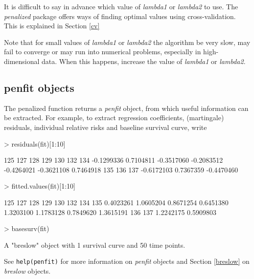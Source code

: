 \documentclass[a4paper]{article}
\newcommand{\Robject}[1]{{\texttt{#1}}}
\newcommand{\Rpackage}[1]{{\textit{#1}}}
\newcommand{\Rclass}[1]{{\textit{#1}}}
\newcommand{\Rfunarg}[1]{{\textit{#1}}}
\begin{document}
It is difficult to say in advance which value of \Rfunarg{lambda1} or \Rfunarg{lambda2} to use. The \Rpackage{penalized} package offers ways of finding optimal values using cross-validation. This is explained in Section \ref{cv}

Note that for small values of \Rfunarg{lambda1} or \Rfunarg{lambda2} the algorithm be very slow, may fail to converge or may run into numerical problems, especially in high-dimensional data. When this happens, increase the value of \Rfunarg{lambda1} or \Rfunarg{lambda2}.


\subsection{penfit objects}

The penalized function returns a \Rclass{penfit} object, from which useful information can be extracted. For example, to extract regression coefficients, (martingale) residuals, individual relative risks and baseline survival curve, write

\begin{Schunk}
\begin{Sinput}
> residuals(fit)[1:10]
\end{Sinput}
\begin{Soutput}
       125        127        128        129        130        132        134 
-0.1299336  0.7104811 -0.3517060 -0.2083512 -0.4264021 -0.3621108  0.7464918 
       135        136        137 
-0.6172103  0.7367359 -0.4470460 
\end{Soutput}
\begin{Sinput}
> fitted.values(fit)[1:10]
\end{Sinput}
\begin{Soutput}
      125       127       128       129       130       132       134       135 
0.4023261 1.0605204 0.8671254 0.6451380 1.3203100 1.1783128 0.7849620 1.3615191 
      136       137 
1.2242175 0.5909803 
\end{Soutput}
\begin{Sinput}
> basesurv(fit)
\end{Sinput}
\begin{Soutput}
A "breslow" object with 1 survival curve and 50 time points.
\end{Soutput}
\end{Schunk}

See \Robject{help(penfit)} for more information on \Rclass{penfit} objects and Section \ref{breslow} on \Rclass{breslow} objects.
\end{document}
